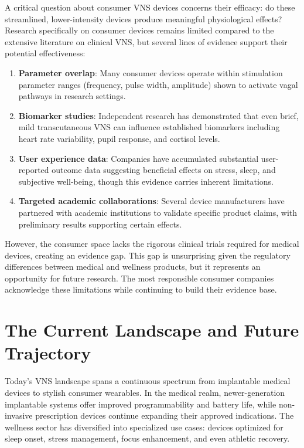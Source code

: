 \documentclass[
  Letterpaper,
]{scrbook}
\begin{document}
A critical question about consumer VNS devices concerns their efficacy:
do these streamlined, lower-intensity devices produce meaningful
physiological effects? Research specifically on consumer devices remains
limited compared to the extensive literature on clinical VNS, but
several lines of evidence support their potential effectiveness:

\begin{enumerate}
\def\labelenumi{\arabic{enumi}.}
\item
  \textbf{Parameter overlap}: Many consumer devices operate within
  stimulation parameter ranges (frequency, pulse width, amplitude) shown
  to activate vagal pathways in research settings.
\item
  \textbf{Biomarker studies}: Independent research has demonstrated that
  even brief, mild transcutaneous VNS can influence established
  biomarkers including heart rate variability, pupil response, and
  cortisol levels.
\item
  \textbf{User experience data}: Companies have accumulated substantial
  user-reported outcome data suggesting beneficial effects on stress,
  sleep, and subjective well-being, though this evidence carries
  inherent limitations.
\item
  \textbf{Targeted academic collaborations}: Several device
  manufacturers have partnered with academic institutions to validate
  specific product claims, with preliminary results supporting certain
  effects.
\end{enumerate}

However, the consumer space lacks the rigorous clinical trials required
for medical devices, creating an evidence gap. This gap is unsurprising
given the regulatory differences between medical and wellness products,
but it represents an opportunity for future research. The most
responsible consumer companies acknowledge these limitations while
continuing to build their evidence base.

\section{The Current Landscape and Future
Trajectory}\label{the-current-landscape-and-future-trajectory}

Today's VNS landscape spans a continuous spectrum from implantable
medical devices to stylish consumer wearables. In the medical realm,
newer-generation implantable systems offer improved programmability and
battery life, while non-invasive prescription devices continue expanding
their approved indications. The wellness sector has diversified into
specialized use cases: devices optimized for sleep onset, stress
management, focus enhancement, and even athletic recovery.
\end{document}
